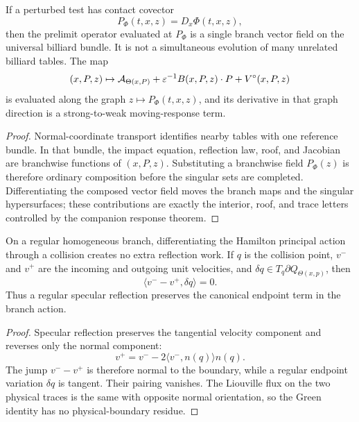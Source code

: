 \begin{lemma}
\label{lem:supp_universal_bundle_covector}
If a perturbed test has contact covector
\[
  P_\Phi(t,x,z)=D_x\Phi(t,x,z),
\]
then the prelimit operator evaluated at \(P_\Phi\) is a single branch vector
field on the universal billiard bundle.  It is not a simultaneous evolution of
many unrelated billiard tables.  The map
\[
  (x,P,z)\mapsto
  \mathcal A_{\Theta(x,P)}
  +\varepsilon^{-1}B(x,P,z)\cdot P+V^\circ(x,P,z)
\]
is evaluated along the graph \(z\mapsto P_\Phi(t,x,z)\), and its derivative in
that graph direction is a strong-to-weak moving-response term.
\end{lemma}

\begin{proof}
Normal-coordinate transport identifies nearby tables with one reference
bundle.  In that bundle, the impact equation, reflection law, roof, and
Jacobian are branchwise functions of \((x,P,z)\).  Substituting a branchwise
field \(P_\Phi(z)\) is therefore ordinary composition before the singular
sets are completed.  Differentiating the composed vector field moves the
branch maps and the singular hypersurfaces; these contributions are exactly
the interior, roof, and trace letters controlled by the companion
response theorem.
\end{proof}

\begin{lemma}
\label{lem:supp_specular_endpoint_variation}
On a regular homogeneous branch, differentiating the Hamilton principal action
through a collision creates no extra reflection work.  If \(q\) is the
collision point, \(v^-\) and \(v^+\) are the incoming and outgoing unit
velocities, and \(\delta q\in T_q\partial Q_{\Theta(x,p)}\), then
\[
  \langle v^- - v^+,\delta q\rangle=0 .
\]
Thus a regular specular reflection preserves the canonical endpoint term in
the branch action.
\end{lemma}

\begin{proof}
Specular reflection preserves the tangential velocity component and reverses
only the normal component:
\[
  v^+=v^- -2\langle v^-,n(q)\rangle n(q).
\]
The jump \(v^- -v^+\) is therefore normal to the boundary, while a regular
endpoint variation \(\delta q\) is tangent.  Their pairing vanishes.  The
Liouville flux on the two physical traces is the same with opposite normal
orientation, so the Green identity has no physical-boundary residue.
\end{proof}

